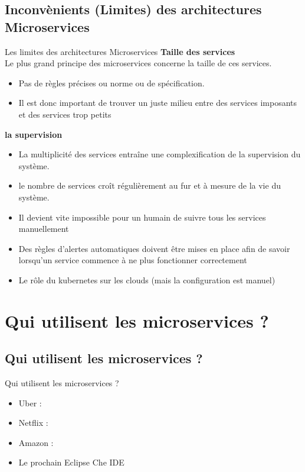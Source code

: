 \documentclass{beamer}
\begin{document}
\subsection{Inconv\`enients (Limites) des architectures Microservices}
    \begin{frame}{Les limites des architectures Microservices}
        \textbf{Taille des services}\\
        Le plus grand principe des microservices concerne la taille de ces services.
        \begin{itemize} 
            \item Pas de règles précises ou norme ou de spécification.
            \item Il est donc important de trouver un juste milieu entre des services imposants et des services trop petits
        \end{itemize} 
        \textbf{la supervision}
        \begin{itemize}
            \item La multiplicité des services entraîne une complexification de la supervision du système.
            \item le nombre de services croît régulièrement au fur et à mesure de la vie du système. 
            \item Il devient vite impossible pour un humain de suivre tous les services manuellement
            \item Des règles d’alertes automatiques doivent être mises en
                place afin de savoir lorsqu’un service
                commence à ne plus fonctionner correctement
            \item \alert{Le rôle du kubernetes sur les clouds (mais la configuration est manuel)}
        \end{itemize} 
    \end{frame}

\section{Qui utilisent les microservices ?}
\subsection{Qui utilisent les microservices ?}
\begin{frame}{Qui utilisent les microservices ?}
    \begin{itemize}
        \item Uber : \href{https://eng.uber.com/soa/}{}
        \item Netflix : \href{http://techblog.netflix.com/}{}
        \item Amazon : \href{http://fr.slideshare.net/apigee/i-love-apis-2015-microservices-at-amazon}{}  
        \item Le prochain Eclipse Che IDE
    \end{itemize} 
\end{frame}
\end{document}
